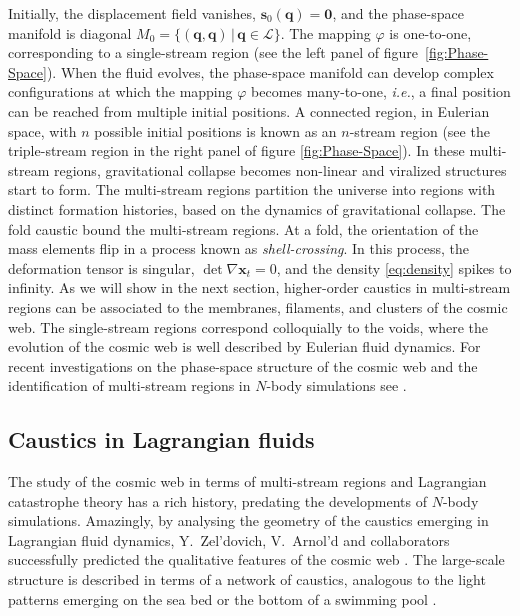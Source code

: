 \documentclass[a4paper, 11pt]{article}
\begin{document}
Initially, the displacement field vanishes, $\bm{s}_0(\bm{q})=\bm{0}$, and the phase-space manifold is diagonal $M_0=\{(\bm{q},\bm{q})\,|\,\bm{q} \in \mathcal{L}\}$. The mapping $\varphi$ is one-to-one, corresponding to a single-stream region (see the left panel of figure\ \ref{fig:Phase-Space}). When the fluid evolves, the phase-space manifold can develop complex configurations at which the mapping $\varphi$ becomes many-to-one, \textit{i.e.}, a final position can be reached from multiple initial positions. A connected region, in Eulerian space, with $n$ possible initial positions is known as an $n$-stream region (see the triple-stream region in the right panel of figure \ref{fig:Phase-Space}). In these multi-stream regions, gravitational collapse becomes non-linear and viralized structures start to form. The multi-stream regions partition the universe into regions with distinct formation histories, based on the dynamics of gravitational collapse. The fold caustic bound the multi-stream regions. At a fold, the orientation of the mass elements flip in a process known as \textit{shell-crossing}. In this process, the deformation tensor is singular, $\det \nabla \bm{x}_t = 0$, and the density \eqref{eq:density} spikes to infinity. As we will show in the next section, higher-order caustics in multi-stream regions can be associated to the membranes, filaments, and clusters of the cosmic web. The single-stream regions correspond colloquially to the voids, where the evolution of the cosmic web is well described by Eulerian fluid dynamics. For recent investigations on the phase-space structure of the cosmic web and the identification of multi-stream regions in $N$-body simulations see \cite{Hahn:2007, Abel:2012, Shandarin:2012,  Feldbrugge:2014b, Ramachandra:2015, Ramachandra:2017, Shandarin:2019, Shandarin:2021}.

\subsection{Caustics in Lagrangian fluids}
The study of the cosmic web in terms of multi-stream regions and Lagrangian catastrophe theory has a rich history, predating the developments of $N$-body simulations. Amazingly, by analysing the geometry of the caustics emerging in Lagrangian fluid dynamics, Y.\ Zel'dovich, V.\ Arnol'd and collaborators successfully predicted the qualitative features of the cosmic web \cite{Arnold:1982a, Arnold:1982b, Shandarin:1983, Rozhanskii:1984, Shandarin:1989}. The large-scale structure is described in terms of a network of caustics, analogous to the light patterns emerging on the sea bed or the bottom of a swimming pool \cite{Berry:1977, Berry:1980, Feldbrugge:2019}. 
\end{document}
